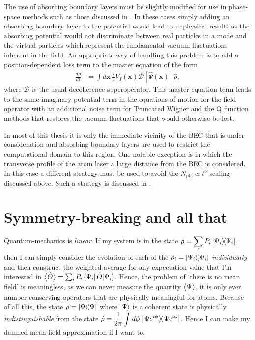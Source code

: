 The use of absorbing boundary layers must be slightly modified for use in phase-space methods such as those discussed in . In these cases simply adding an absorbing boundary layer to the potential would lead to unphysical results as the absorbing potential would not discriminate between real particles in a mode and the virtual particles which represent the fundamental vacuum fluctuations inherent in the field. An appropriate way of handling this problem is to add a position-dependent loss term to the master equation of the form
\begin{align}
    \label{BackgroundTheory:PhaseSpaceAbsorbingBoundaryLayer}
    \frac{d \hat{\rho}}{dt} &= \int d \bm{x}\, \frac{2}{\hbar}V_I(\bm{x})\mathcal{D}[\hat{\Psi}(\bm{x})]\hat{\rho},
\end{align}
where $\mathcal{D}$ is the usual decoherence superoperator. This master equation term leads to the same imaginary potential term in the equations of motion for the field operator with an additional noise term for Truncated Wigner and the Q function methods that restores the vacuum fluctuations that would otherwise be lost.

\parasep

In most of this thesis it is only the immediate vicinity of the BEC that is under consideration and absorbing boundary layers are used to restrict the computational domain to this region. One notable exception is  in which the transverse profile of the atom laser a large distance from the BEC is considered. In this case a different strategy must be used to avoid the $N_\text{pts} \propto t^3$ scaling discussed above. Such a strategy is discussed in .

\section{Symmetry-breaking and all that}
\label{BackgroundTheory:SymmetryBreaking}

Quantum-mechanics is \emph{linear}. If my system is in the state $\displaystyle \hat{\rho} = \sum_i P_i \left|\Psi_i\middle>\!\middle<\Psi_i\right|$, then I can simply consider the evolution of each of the $\displaystyle \rho_i = \left|\Psi_i\middle>\!\middle<\Psi_i\right|$ \emph{individually} and then construct the weighted average for any expectation value that I'm interested in ${\big<\hat{O}\big>} = \sum_i P_i \left<\Psi_i\right|\hat{O}{\left|\Psi_i\right>}$. Hence, the problem of `there is no mean field' is meaningless, as we can never measure the quantity ${\big<\hat{\Psi}\big>}$, it is only ever number-conserving operators that are physically meaningful for atoms. Because of all this, the state $\hat{\rho} = \left|\Psi\middle>\!\middle<\Psi\right|$ where ${\left|\Psi\right>}$ is a coherent state is physically \emph{indistinguishable} from the state $\displaystyle \hat{\rho} = \frac{1}{2\pi}\int d\phi\, \left|\Psi e^{i\phi}\middle>\!\middle<\Psi e^{i\phi}\right|$. Hence I can make my damned mean-field approximation if I want to.

